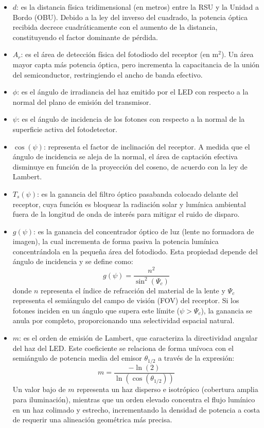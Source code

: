 \begin{itemize}
	\item $d$: es la distancia física tridimensional (en metros) entre la RSU y la Unidad a Bordo (OBU). Debido a la ley del inverso del cuadrado, la potencia óptica recibida decrece cuadráticamente con el aumento de la distancia, constituyendo el factor dominante de pérdida.
	\item $A_r$: es el área de detección física del fotodiodo del receptor (en $\text{m}^2$). Un área mayor capta más potencia óptica, pero incrementa la capacitancia de la unión del semiconductor, restringiendo el ancho de banda efectivo.
	\item $\phi$: es el ángulo de irradiancia del haz emitido por el LED con respecto a la normal del plano de emisión del transmisor.
	\item $\psi$: es el ángulo de incidencia de los fotones con respecto a la normal de la superficie activa del fotodetector.
	\item $\cos(\psi)$: representa el factor de inclinación del receptor. A medida que el ángulo de incidencia se aleja de la normal, el área de captación efectiva disminuye en función de la proyección del coseno, de acuerdo con la ley de Lambert.
	\item $T_s(\psi)$: es la ganancia del filtro óptico pasabanda colocado delante del receptor, cuya función es bloquear la radiación solar y lumínica ambiental fuera de la longitud de onda de interés para mitigar el ruido de disparo.
	\item $g(\psi)$: es la ganancia del concentrador óptico de luz (lente no formadora de imagen), la cual incrementa de forma pasiva la potencia lumínica concentrándola en la pequeña área del fotodiodo. Esta propiedad depende del ángulo de incidencia y se define \cite{ghassemlooy2019optical} como:
	\begin{equation}
		g(\psi) = \frac{n^2}{\sin^2(\Psi_c)}
		\label{eq:ganancia_concentrador}
	\end{equation}
	donde $n$ representa el índice de refracción del material de la lente y $\Psi_c$ representa el semiángulo del campo de visión (FOV) del receptor. Si los fotones inciden en un ángulo que supera este límite ($\psi > \Psi_c$), la ganancia se anula por completo, proporcionando una selectividad espacial natural.
	\item $m$: es el orden de emisión de Lambert, que caracteriza la directividad angular del haz del LED. Este coeficiente se relaciona de forma unívoca con el semiángulo de potencia media del emisor $\theta_{1/2}$ a través de la expresión:
	\begin{equation}
		m = \frac{- \ln(2)}{\ln(\cos(\theta_{1/2}))}
		\label{eq:orden_lambert}
	\end{equation}
	Un valor bajo de $m$ representa un haz disperso e isotrópico (cobertura amplia para iluminación), mientras que un orden elevado concentra el flujo lumínico en un haz colimado y estrecho, incrementando la densidad de potencia a costa de requerir una alineación geométrica más precisa.
\end{itemize}

